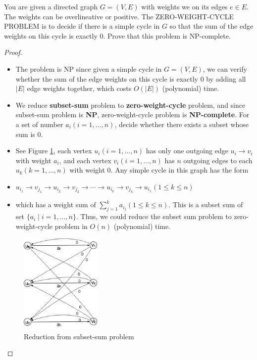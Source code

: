 \documentclass{article}
\newcounter{exercise}
\newcommand{\<}{
    \langle}
\renewcommand{\>}{
    \rangle}
\begin{document}
{\begin{exercise}
You are given a directed graph $G=(V,E)$ with weights we on its edges $e\in E$. The weights can be overlineative or positive. The \textsf{ZERO-WEIGHT-CYCLE PROBLEM} is to decide if there is a simple cycle in $G$ so that the sum of the edge weights on this cycle is exactly $0$. Prove that this problem is NP-complete.
\end{exercise}
\begin{proof}
    \leavevmode\newline
    \begin{itemize}
        \item The problem is NP since given a simple cycle in $G=(V,E)$, we can verify whether the sum of the edge weights on this cycle is exactly $0$ by adding all $|E|$ edge weights together, which costs $O(|E|)$ (polynomial) time.
        \item We reduce \textbf{subset-sum} problem to \textbf{zero-weight-cycle} problem, and since {subset-sum} problem is \textbf{NP}, zero-weight-cycle problem is \textbf{NP-complete}. For a set of number $a_i(i=1,\ldots ,n)$, decide whether there exists a subset whose sum is $0$.
        \item See Figure \ref{fig:ccc}, each vertex $u_i(i=1,\ldots ,n)$ has only one outgoing edge $u_i\rightarrow v_i$ with weight $a_i$, and each vertex $v_i(i=1,\ldots ,n)$ has $n$ outgoing edges to each $u_k(k=1,\ldots,n)$ with weight $0$. Any simple cycle in this graph has the form
        \item $u_{i_1}\rightarrow v_{j_1}\rightarrow u_{i_2}\rightarrow v_{j_2}\rightarrow \cdots \rightarrow u_{i_k}\rightarrow v_{j_k} \rightarrow u_{i_1}(1\leq k\leq n)$
        \item which has a weight sum of $\sum\limits_{j=1}^{k}a_{i_j}(1\leq k\leq n)$. This is a subset sum of set $\{a_i\mid i=1,\ldots ,n\}$. Thus, we could reduce the subset sum problem to zero-weight-cycle problem in $O(n)$ (polynomial) time.
    \end{itemize}

\begin{figure}[!htp]
    \centering
    \includegraphics[width=0.35\textwidth]{img/4.jpg}
    \caption{Reduction from subset-sum problem}
    \label{fig:ccc}
\end{figure}


\end{proof}}
\end{document}
